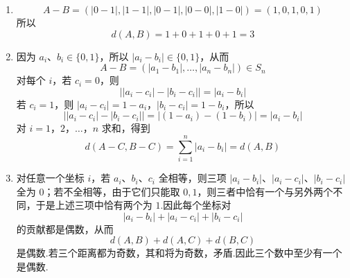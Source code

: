 \begin{solution}
\begin{enumerate}
\item
\[
A-B=(|0-1|,|1-1|,|0-1|,|0-0|,|1-0|)=(1,0,1,0,1)
\]
所以
\[
d(A,B)=1+0+1+0+1=3
\]

\item 因为 \(a_i\)、\(b_i\in\{0,1\}\)，所以 \(|a_i-b_i|\in\{0,1\}\)，从而
\[
A-B=(|a_1-b_1|,\ldots,|a_n-b_n|)\in S_n
\]
对每个 \(i\)，若 \(c_i=0\)，则
\[
\bigl||a_i-c_i|-|b_i-c_i|\bigr|=|a_i-b_i|
\]
若 \(c_i=1\)，则 \(|a_i-c_i|=1-a_i\)，\(|b_i-c_i|=1-b_i\)，所以
\[
\bigl||a_i-c_i|-|b_i-c_i|\bigr|=|(1-a_i)-(1-b_i)|=|a_i-b_i|
\]
对 \(i=1\)，\(2\)，\(\ldots\)，\(n\) 求和，得到
\[
d(A-C,B-C)=\sum_{i=1}^{n}|a_i-b_i|=d(A,B)
\]

\item 对任意一个坐标 \(i\)，若 \(a_i\)、\(b_i\)、\(c_i\) 全相等，则三项 \(|a_i-b_i|\)、\(|a_i-c_i|\)、\(|b_i-c_i|\) 全为 \(0\)；若不全相等，由于它们只能取 \(0,1\)，则三者中恰有一个与另外两个不同，于是上述三项中恰有两个为 \(1\).因此每个坐标对
\[
|a_i-b_i|+|a_i-c_i|+|b_i-c_i|
\]
的贡献都是偶数，从而
\[
d(A,B)+d(A,C)+d(B,C)
\]
是偶数.若三个距离都为奇数，其和将为奇数，矛盾.因此三个数中至少有一个是偶数.
\end{enumerate}
\end{solution}
